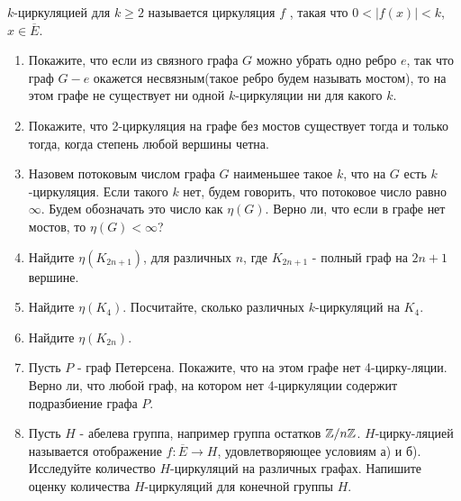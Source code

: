 $k$-циркуляцией для $k\geq 2$ называется циркуляция $f$ , такая что $0<|f(x)|<k$, $x\in \overline{E}$.

\begin{enumerate}
\item Покажите, что если из связного графа $G$ можно убрать одно ребро $e$, так что граф $G-e$ окажется несвязным(такое ребро будем называть мостом), то на этом графе не существует ни одной $k$-циркуляции ни для какого $k$.
\item Покажите, что 2-циркуляция на графе без мостов существует тогда и только тогда, когда степень любой вершины четна.
\item Назовем потоковым числом графа $G$ наименьшее такое $k$, что на $G$ есть $k$-циркуляция. Если такого $k$ нет, будем говорить, что потоковое число равно $\infty$. Будем обозначать это число как $\eta(G)$. Верно ли, что если в графе нет мостов, то $\eta(G)<\infty$?
\item Найдите $\eta(K_{2n+1})$, для различных $n$, где $K_{2n+1}$ - полный граф на $2n+1$ вершине.
\item Найдите $\eta(K_{4})$. Посчитайте, сколько различных $k$-циркуляций на $K_4$.
\item Найдите $\eta(K_{2n})$.
\item Пусть $P$ - граф Петерсена. Покажите, что на этом графе нет 4-цирку-\linebreak ляции. Верно ли, что любой граф, на котором нет 4-циркуляции содержит подразбиение графа $P$.

\item Пусть $H$ - абелева группа, например группа остатков $\mathbb{Z}/n\mathbb{Z}$. $H$-цирку-\linebreak ляцией называется отображение $f\colon \overline{E} \to H$, удовлетворяющее условиям а) и б). Исследуйте количество $H$-циркуляций на различных графах. Напишите оценку количества $H$-циркуляций для конечной группы $H$.

\end{enumerate}



